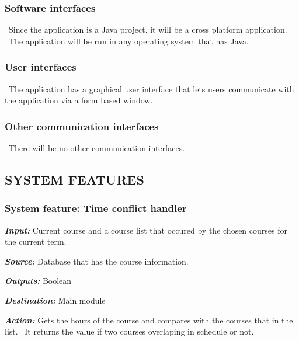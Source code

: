 \documentclass[twoside,letterpaper]{article}
\newcommand{\featuresection}[1] {
\subsubsection[System feature: #1]{\selectlanguage{english}\rmfamily\bfseries\color{black} System feature: #1}
}
\begin{document}
\subsubsection[Software
interfaces]{\rmfamily\bfseries\color{black}
Software interfaces}
{\color{black}
\foreignlanguage{english}{\ }\foreignlanguage{english}{Since the application is a Java project, it will be a cross platform application. \ The application will be run in any operating system that has Java.}}

\subsubsection[User
interfaces]{\rmfamily\bfseries\color{black}
User interfaces}
{\color{black}
\foreignlanguage{english}{\ }\foreignlanguage{english}{The application has a graphical user interface that lets users communicate with the application via a form based window.}

\subsubsection[Other communication
interfaces]{\rmfamily\bfseries\color{black}
Other communication interfaces}
{\color{black}
\foreignlanguage{english}{\ }\foreignlanguage{english}{There will be no other communication interfaces.}}

\subsection[SYSTEM
FEATURES]{\rmfamily\bfseries\color{black}
SYSTEM FEATURES}


\featuresection{Time conflict handler}
\label{sssec:timeHandler}

\emph{\textbf{Input:}}  Current course and a course list that occured by the chosen courses for the current term.

\emph{\textbf{Source:}} Database that has the course information.

\emph{\textbf{Outputs:}} Boolean

\emph{\textbf{Destination:}} Main module

\emph{\textbf{Action:}} Gets the hours of the course and compares with the courses that in the list. \ It returns the value if two courses overlaping in schedule or not.

}
\end{document}
